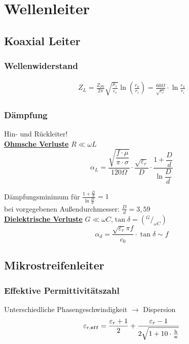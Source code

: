\section{Wellenleiter}
\subsection{Koaxial Leiter}
\subsubsection{Wellenwiderstand}


\begin{align*}
    Z_L = \frac{Z_{F0}}{2\pi}\sqrt{\frac{\mu_r}{\varepsilon_r}}\ln\left( \frac{r_a}{r_i} \right)  =\frac{60\Omega}{\sqrt{\varepsilon_r}}\cdot \ln{\frac{r_a}{r_i}}
\end{align*}

\subsubsection{Dämpfung}
Hin- und Rückleiter!\\
\underline{\textbf{Ohmsche Verluste}} $R\ll\omega L$
\[
    \alpha_L = \frac{\sqrt{\dfrac{f\cdot\mu}{\pi\cdot\sigma}}}{120\Omega}\cdot\frac{\sqrt{\varepsilon_r}}{D}\cdot\dfrac{1+\dfrac{D}{d}}{\ln \dfrac{D}{d}}
\]

Dämpfungsminimum für $ \frac{1+\tfrac{D}{d}}{\ln \tfrac{D}{d}} = 1 $\\ bei vorgegebenen Außendurchmesser: $ \frac{D}{d} =3,59 $\\

\underline{\textbf{Dielektrische Verluste}} $G\ll\omega C$,$\tan\delta= (^G/_{\omega C})$
\[
    \alpha_d = \frac{\sqrt{\varepsilon_r}\pi f}{c_0}\cdot\tan\delta \sim f
\]

\subsection{Mikrostreifenleiter}

\subsubsection{Effektive Permittivitätszahl}
Unterschiedliche Phasengeschwindigkeit $\rightarrow$ Dispersion
\[
         \varepsilon_{r,\texttt{eff}}  = \frac{\varepsilon_r+1}{2}+\frac{\varepsilon_r-1}{2\sqrt{1+10\cdot\frac{\text{h}}{\text{w}}}} \\
\]

